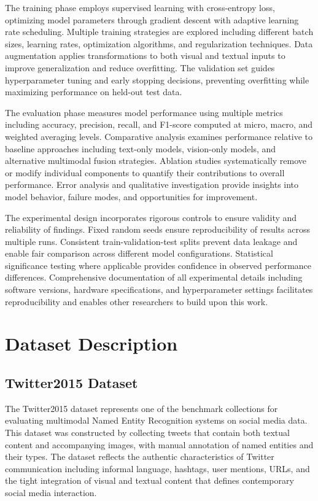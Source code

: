 \documentclass[12pt,a4paper]{report}
\begin{document}
The training phase employs supervised learning with cross-entropy loss, optimizing model parameters through gradient descent with adaptive learning rate scheduling. Multiple training strategies are explored including different batch sizes, learning rates, optimization algorithms, and regularization techniques. Data augmentation applies transformations to both visual and textual inputs to improve generalization and reduce overfitting. The validation set guides hyperparameter tuning and early stopping decisions, preventing overfitting while maximizing performance on held-out test data.

The evaluation phase measures model performance using multiple metrics including accuracy, precision, recall, and F1-score computed at micro, macro, and weighted averaging levels. Comparative analysis examines performance relative to baseline approaches including text-only models, vision-only models, and alternative multimodal fusion strategies. Ablation studies systematically remove or modify individual components to quantify their contributions to overall performance. Error analysis and qualitative investigation provide insights into model behavior, failure modes, and opportunities for improvement.

The experimental design incorporates rigorous controls to ensure validity and reliability of findings. Fixed random seeds ensure reproducibility of results across multiple runs. Consistent train-validation-test splits prevent data leakage and enable fair comparison across different model configurations. Statistical significance testing where applicable provides confidence in observed performance differences. Comprehensive documentation of all experimental details including software versions, hardware specifications, and hyperparameter settings facilitates reproducibility and enables other researchers to build upon this work.

\section{Dataset Description}

\subsection{Twitter2015 Dataset}

The Twitter2015 dataset represents one of the benchmark collections for evaluating multimodal Named Entity Recognition systems on social media data. This dataset was constructed by collecting tweets that contain both textual content and accompanying images, with manual annotation of named entities and their types. The dataset reflects the authentic characteristics of Twitter communication including informal language, hashtags, user mentions, URLs, and the tight integration of visual and textual content that defines contemporary social media interaction.
\end{document}
